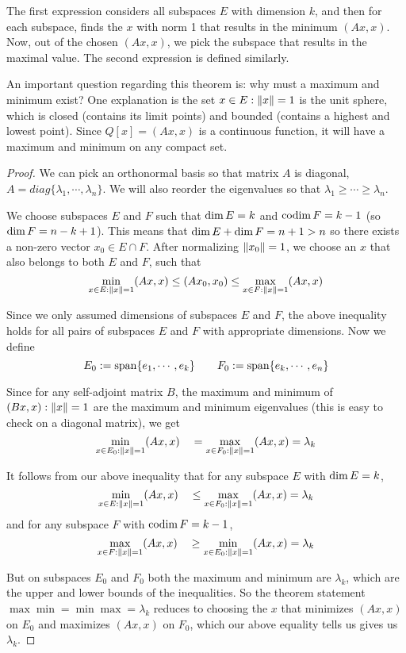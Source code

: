 The first expression considers all subspaces $E$ with dimension $k$, and then for each subspace, finds the $x$ with norm 1 that results in the minimum $(Ax, x)$. Now, out of the chosen $(Ax, x)$, we pick the subspace that results in the maximal value. The second expression is defined similarly. 

An important question regarding this theorem is: why must a maximum and minimum exist? One explanation is the set $x \in E : \norm{x} = 1$ is the unit sphere, which is closed (contains its limit points) and bounded (contains a highest and lowest point). Since $Q[x] = (Ax, x)$ is a continuous function, it will have a maximum and minimum on any compact set. 

\begin{proof}
We can pick an orthonormal basis so that matrix $A$ is diagonal, $A = diag\{ \lambda_{1}, \cdots, \lambda_{n} \}$. We will also reorder the eigenvalues so that $\lambda_{1} \geq \cdots \geq \lambda_{n}$.

We choose subspaces $E$ and $F$ such that $\operatorname{dim} E = k$ and $\operatorname{codim} F = k -1$ (so $\operatorname{dim} F = n - k + 1$). This means that $\operatorname{dim} E + \operatorname{dim} F = n + 1 > n$ so there exists a non-zero vector $x_{0} \in E \cap F$. After normalizing $\norm{x_{0}} = 1$, we choose an $x$ that also belongs to both $E$ and $F$, such that
$$\min_{x \in E: \norm{x} = 1} (Ax, x) \leq (Ax_{0}, x_{0}) \leq \max_{x \in F: \norm{x} = 1} (Ax, x)$$

Since we only assumed dimensions of subspaces $E$ and $F$, the above inequality holds for all pairs of subspaces $E$ and $F$ with appropriate dimensions. Now we define 
$$E_{0} := \operatorname{span}\{e_{1}, \cdots, e_{k} \} \qquad F_{0} := \operatorname{span} \{e_{k}, \cdots, e_{n} \}$$ 

Since for any self-adjoint matrix $B$, the maximum and minimum of $(Bx, x) : \norm{x} = 1$ are the maximum and minimum eigenvalues (this is easy to check on a diagonal matrix), we get 
$$\min_{x \in E_{0} : \norm{x} = 1} (Ax, x) \quad = \max_{x \in F_{0} : \norm{x} = 1} (Ax, x) = \lambda_{k}$$

It follows from our above inequality that for any subspace $E$ with $\operatorname{dim} E = k$, 
$$\min_{x \in E : \norm{x} = 1} (Ax, x) \quad \leq \max_{x \in F_{0} : \norm{x} = 1} (Ax, x) = \lambda_{k}$$
and for any subspace $F$ with $\operatorname{codim} F = k - 1$, 
$$\max_{x \in F : \norm{x} = 1} (Ax, x) \quad \geq \min_{x \in E_{0} : \norm{x} = 1} (Ax, x) = \lambda_{k}$$

But on subspaces $E_{0}$ and $F_{0}$ both the maximum and minimum are $\lambda_{k}$, which are the upper and lower bounds of the inequalities. So the theorem statement $\max \min = \min \max = \lambda_{k}$ reduces to choosing the $x$ that minimizes $(Ax, x)$ on $E_{0}$ and maximizes $(Ax, x)$ on $F_{0}$, which our above equality tells us gives us $\lambda_{k}$. 
\end{proof}

